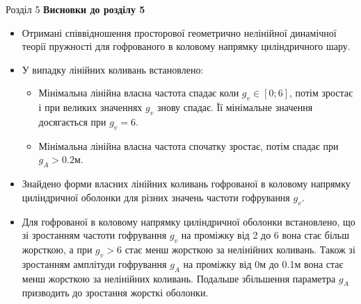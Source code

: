 \documentclass[8pt]{beamer}
\numberwithin{figure}{section}
\numberwithin{equation}{section}
\numberwithin{table}{section}
\begin{document}
\begin{frame}{Розділ 5}
\textbf{Висновки до розділу 5}\\
\vspace{1em}
\begin{itemize}
\item Отримані співвідношення просторової геометрично нелінійної динамічної теорії пружності для гофрованого в коловому напрямку циліндричного шару.
\item У випадку лінійних коливань встановлено:
\begin{itemize}
     \item Мінімальна лінійна власна частота спадає коли $g_v \in [0;6] $, потім зростає і при великих значеннях $g_v$ знову спадає. Її мінімальне значення досягається при $g_v = 6$. 
     \item Мінімальна лінійна власна частота спочатку зростає, потім спадає при $g_A > 0.2$м.
   \end{itemize}
 
\item Знайдено форми власних лінійних коливань гофрованої в коловому напрямку циліндричної оболонки для різних значень частоти гофрування $g_v$.
\item Для гофрованої в коловому напрямку циліндричної оболонки встановлено, що зі зростанням частоти гофрування $g_v$ на проміжку від 2 до 6 вона стає більш жорсткою, а при $g_v > 6$ стає менш жорсткою за нелінійних коливань. Також зі зростанням амплітуди гофрування $g_A$ на проміжку від 0м до 0.1м вона стає менш жорсткою за нелінійних коливань. Подальше збільшення параметра $g_A$ призводить до зростання жорсткі оболонки.

\end{itemize}

\end{frame}
\end{document}
